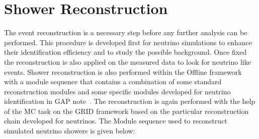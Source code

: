 \section{Shower Reconstruction}
\label{sec:reco}

The event reconstruction is a necessary step before any further analysis can be performed. This procedure is developed first for neutrino simulations to enhance their identification efficiency and to study the possible background. Once fixed the reconstruction is also applied on the measured data to look for neutrino like events. Shower reconstruction is also performed within the Offline framework with a module sequence that contains a combination of some standard reconstruction modules and some specific modules developed for neutrino identification in GAP note~\cite{gap_note_2013}. The reconstruction is again performed with the help of the MC task on the GRID framework based on the particular reconstruction chain developed for neutrinos. The Module sequence used to reconstruct simulated neutrino showers is given below:

